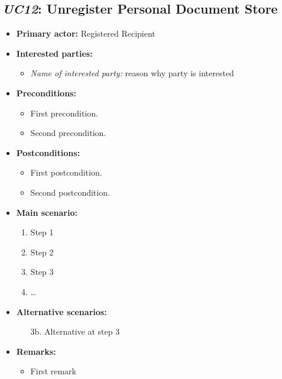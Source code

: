 \documentclass[a4paper,10pt]{article}
\begin{document}
\subsection{\emph{UC12}: Unregister Personal Document Store}
\begin{itemize}
    \item \textbf{Primary actor:} Registered Recipient
    \item \textbf{Interested parties:} 
        \begin{itemize}
            \item \textit{Name of interested party:} reason why party is interested
        \end{itemize}

    \item \textbf{Preconditions:}
        \begin{itemize}
            \item First precondition.
            \item Second precondition.
        \end{itemize}

    \item \textbf{Postconditions:}
        \begin{itemize}
            \item First postcondition.
            \item Second postcondition.
        \end{itemize}
        
    \item \textbf{Main scenario:} 
    \begin{enumerate}
       \item Step 1
       \item Step 2
       \item Step 3
       \item \ldots
    \end{enumerate}

    \item \textbf{Alternative scenarios:} 
    \begin{enumerate}
        \item [3b.] Alternative at step 3
    \end{enumerate}
    
    \item \textbf{Remarks:}
        \begin{itemize}
            \item First remark
        \end{itemize}
\end{itemize}
\end{document}
